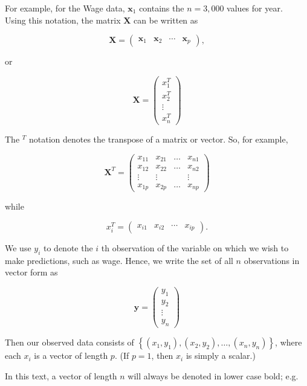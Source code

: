 \documentclass[10pt]{article}
\begin{document}
For example, for the Wage data, $\mathbf{x}_{1}$ contains the $n=3,000$ values for year.\\
Using this notation, the matrix $\mathbf{X}$ can be written as

$$
\mathbf{X}=\left(\begin{array}{llll}
\mathbf{x}_{1} & \mathbf{x}_{2} & \cdots & \mathbf{x}_{p}
\end{array}\right),
$$

or

$$
\mathbf{X}=\left(\begin{array}{c}
x_{1}^{T} \\
x_{2}^{T} \\
\vdots \\
x_{n}^{T}
\end{array}\right)
$$

The ${ }^{T}$ notation denotes the transpose of a matrix or vector. So, for example,

$$
\mathbf{X}^{T}=\left(\begin{array}{cccc}
x_{11} & x_{21} & \ldots & x_{n 1} \\
x_{12} & x_{22} & \ldots & x_{n 2} \\
\vdots & \vdots & & \vdots \\
x_{1 p} & x_{2 p} & \ldots & x_{n p}
\end{array}\right)
$$

while

$$
x_{i}^{T}=\left(\begin{array}{llll}
x_{i 1} & x_{i 2} & \cdots & x_{i p}
\end{array}\right) .
$$

We use $y_{i}$ to denote the $i$ th observation of the variable on which we wish to make predictions, such as wage. Hence, we write the set of all $n$ observations in vector form as

$$
\mathbf{y}=\left(\begin{array}{c}
y_{1} \\
y_{2} \\
\vdots \\
y_{n}
\end{array}\right)
$$

Then our observed data consists of $\left\{\left(x_{1}, y_{1}\right),\left(x_{2}, y_{2}\right), \ldots,\left(x_{n}, y_{n}\right)\right\}$, where each $x_{i}$ is a vector of length $p$. (If $p=1$, then $x_{i}$ is simply a scalar.)

In this text, a vector of length $n$ will always be denoted in lower case bold; e.g.
\end{document}
